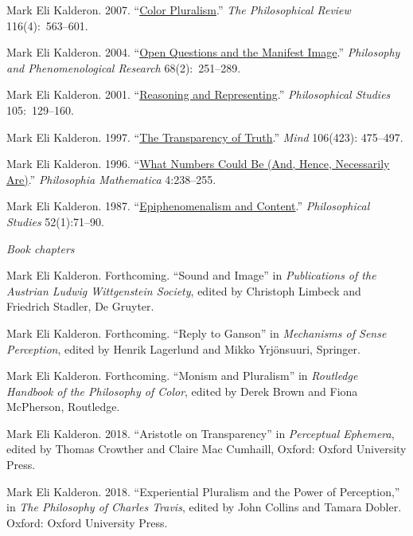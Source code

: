 \documentclass[11pt]{article}
\begin{document}
\ind  Mark Eli Kalderon. 2007.  ``\href{http://philreview.dukejournals.org/content/116/4/563.full.pdf+html}{Color Pluralism}.'' \emph{The Philosophical Review} 116(4):~563--601.

\ind  Mark Eli Kalderon. 2004.  ``\href{http://onlinelibrary.wiley.com/doi/10.1111/j.1933-1592.2004.tb00341.x/pdf}{Open Questions and the Manifest Image}.'' \emph{Philosophy and Phenomenological Research} 68(2):~251--289.

\ind  Mark Eli Kalderon. 2001.  ``\href{http://www.springerlink.com/content/u5286534982v0317/fulltext.pdf}{Reasoning and Representing}.'' \emph{Philosophical Studies} 105:~129--160.

\ind Mark Eli Kalderon. 1997.
``\href{http://mind.oxfordjournals.org/content/106/423/475.full.pdf}{The Transparency of Truth}.'' \emph{Mind} 106(423): 475--497.

\ind Mark Eli Kalderon. 1996.
``\href{http://philmat.oxfordjournals.org/content/4/3/238.full.pdf}{What Numbers Could Be (And, Hence, Necessarily Are)}.'' \emph{Philosophia Mathematica} 4:238--255.

\ind Mark Eli Kalderon. 1987.
``\href{http://www.jstor.org/stable/4319905}{Epiphenomenalism and Content}.'' \emph{Philosophical Studies} 52(1):71--90.

\bigskip

\noindent\emph{Book chapters \vspace{0.05in}}

\ind Mark Eli Kalderon. Forthcoming. ``Sound and Image'' in \emph{Publications of the Austrian Ludwig Wittgenstein Society}, edited by Christoph Limbeck and Friedrich Stadler, De Gruyter.

\ind Mark Eli Kalderon. Forthcoming. ``Reply to Ganson'' in \emph{Mechanisms of Sense Perception}, edited by Henrik Lagerlund and Mikko Yrjönsuuri, Springer.

\ind Mark Eli Kalderon. Forthcoming. ``Monism and Pluralism'' in \emph{Routledge Handbook of the Philosophy of Color}, edited by Derek Brown and Fiona McPherson, Routledge.

\ind Mark Eli Kalderon. 2018. ``Aristotle on Transparency'' in \emph{Perceptual Ephemera}, edited by Thomas Crowther and Claire Mac Cumhaill, Oxford: Oxford University Press. 

\ind Mark Eli Kalderon. 2018. ``Experiential Pluralism and the Power of Perception,'' in \emph{The Philosophy of Charles Travis}, edited by John Collins and Tamara Dobler. Oxford: Oxford University Press. 
\end{document}
